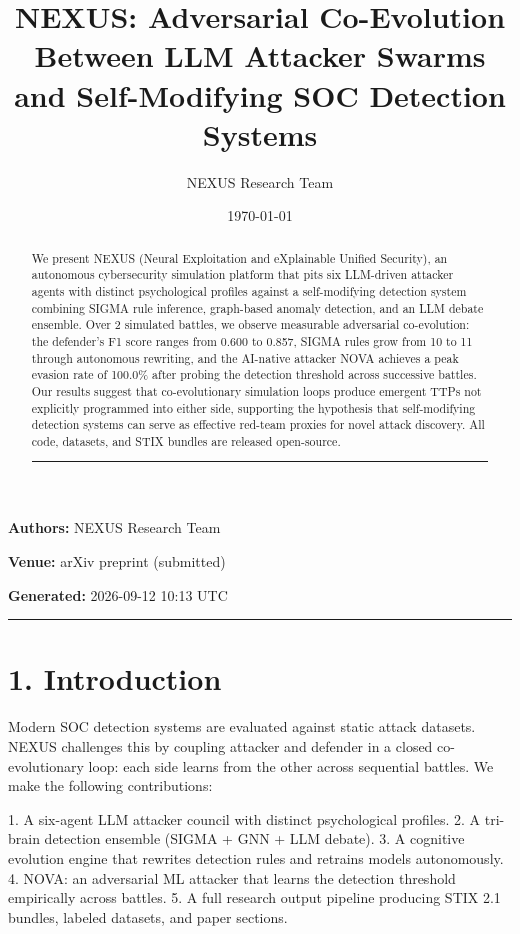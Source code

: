 \documentclass{article}
\title{NEXUS: Adversarial Co-Evolution Between LLM Attacker Swarms and Self-Modifying SOC Detection Systems}
\author{NEXUS Research Team}
\date{\today}
\begin{document}
\maketitle


\textbf{Authors:} NEXUS Research Team  

\textbf{Venue:} arXiv preprint (submitted)  

\textbf{Generated:} 2026-09-12 10:13 UTC  

\hrule\vspace{6pt}

\begin{abstract}

We present NEXUS (Neural Exploitation and eXplainable Unified Security), an autonomous cybersecurity simulation platform that pits six LLM-driven attacker agents with distinct psychological profiles against a self-modifying detection system combining SIGMA rule inference, graph-based anomaly detection, and an LLM debate ensemble. Over 2 simulated battles, we observe measurable adversarial co-evolution: the defender's F1 score ranges from 0.600 to 0.857, SIGMA rules grow from 10 to 11 through autonomous rewriting, and the AI-native attacker NOVA achieves a peak evasion rate of 100.0\% after probing the detection threshold across successive battles. Our results suggest that co-evolutionary simulation loops produce emergent TTPs not explicitly programmed into either side, supporting the hypothesis that self-modifying detection systems can serve as effective red-team proxies for novel attack discovery. All code, datasets, and STIX bundles are released open-source.


\hrule\vspace{6pt}

\end{abstract}

\section{1. Introduction}

Modern SOC detection systems are evaluated against static attack datasets. NEXUS challenges this by coupling attacker and defender in a closed co-evolutionary loop: each side learns from the other across sequential battles. We make the following contributions:

1. A six-agent LLM attacker council with distinct psychological profiles.
2. A tri-brain detection ensemble (SIGMA + GNN + LLM debate).
3. A cognitive evolution engine that rewrites detection rules and retrains models autonomously.
4. NOVA: an adversarial ML attacker that learns the detection threshold empirically across battles.
5. A full research output pipeline producing STIX 2.1 bundles, labeled datasets, and paper sections.
\end{document}
